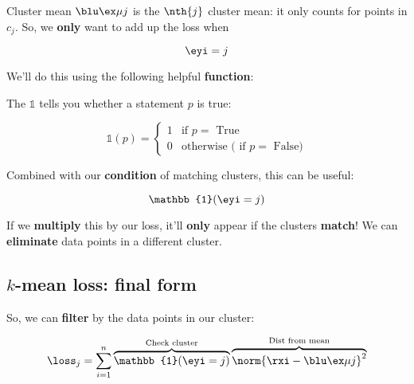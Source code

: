         Cluster mean $\bmuj$ is the $\nth{j}$ cluster mean: it only counts for points in $c_j$. So, we \textbf{only} want to add up the loss when 
        
        \begin{equation}
            \eyi = j
        \end{equation}
        
        We'll do this using the following helpful \textbf{function}:\\
        
        \begin{notation}
            The  $\mathbb{1}$ tells you whether a statement $p$ is true:
            
            \begin{equation*}
                \mathbb{1}(p) = 
                \begin{cases}
                    1 & \text{if $p=$ True} \\
                    0 & \text{otherwise ( if $p=$ False)}
                \end{cases}
            \end{equation*}
        \end{notation}
        
        Combined with our \textbf{condition} of matching clusters, this can be useful:
        
        \begin{equation}
            \mathbb{1}(\eyi = j)
        \end{equation}
        
        If we \textbf{multiply} this by our loss, it'll \textbf{only} appear if the clusters \textbf{match}! We can \textbf{eliminate} data points in a different cluster.
        
    \subsection*{$k$-mean loss: final form}
    
        So, we can \textbf{filter} by the data points in our cluster:
        
        \begin{equation}
            \loss_j =
            \sum_{i=1}^n 
                \overbrace{
                    \mathbb{1}(\eyi = j)
                }^{ \text{Check cluster}}
                \overbrace{
                    \norm{ \rxi - \bmuj }^2 
                }^{\text{Dist from mean} }
        \end{equation}
        
